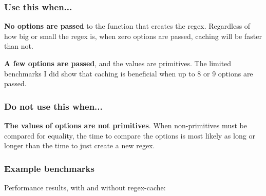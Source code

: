 \subsubsection*{Use this when...}


\begin{DoxyItemize}
\item {\bfseries No options are passed} to the function that creates the regex. Regardless of how big or small the regex is, when zero options are passed, caching will be faster than not.
\item {\bfseries A few options are passed}, and the values are primitives. The limited benchmarks I did show that caching is beneficial when up to 8 or 9 options are passed.
\end{DoxyItemize}

\subsubsection*{Do not use this when...}


\begin{DoxyItemize}
\item {\bfseries The values of options are not primitives}. When non-\/primitives must be compared for equality, the time to compare the options is most likely as long or longer than the time to just create a new regex.
\end{DoxyItemize}

\subsubsection*{Example benchmarks}

Performance results, with and without regex-\/cache\+:


